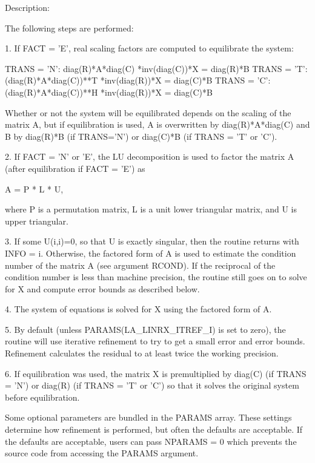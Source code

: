 \begin{DoxyParagraph}{Description\+: }
\begin{DoxyVerb}    The following steps are performed:

    1. If FACT = 'E', real scaling factors are computed to equilibrate
    the system:

      TRANS = 'N':  diag(R)*A*diag(C)     *inv(diag(C))*X = diag(R)*B
      TRANS = 'T': (diag(R)*A*diag(C))**T *inv(diag(R))*X = diag(C)*B
      TRANS = 'C': (diag(R)*A*diag(C))**H *inv(diag(R))*X = diag(C)*B

    Whether or not the system will be equilibrated depends on the
    scaling of the matrix A, but if equilibration is used, A is
    overwritten by diag(R)*A*diag(C) and B by diag(R)*B (if TRANS='N')
    or diag(C)*B (if TRANS = 'T' or 'C').

    2. If FACT = 'N' or 'E', the LU decomposition is used to factor
    the matrix A (after equilibration if FACT = 'E') as

      A = P * L * U,

    where P is a permutation matrix, L is a unit lower triangular
    matrix, and U is upper triangular.

    3. If some U(i,i)=0, so that U is exactly singular, then the
    routine returns with INFO = i. Otherwise, the factored form of A
    is used to estimate the condition number of the matrix A (see
    argument RCOND). If the reciprocal of the condition number is less
    than machine precision, the routine still goes on to solve for X
    and compute error bounds as described below.

    4. The system of equations is solved for X using the factored form
    of A.

    5. By default (unless PARAMS(LA_LINRX_ITREF_I) is set to zero),
    the routine will use iterative refinement to try to get a small
    error and error bounds.  Refinement calculates the residual to at
    least twice the working precision.

    6. If equilibration was used, the matrix X is premultiplied by
    diag(C) (if TRANS = 'N') or diag(R) (if TRANS = 'T' or 'C') so
    that it solves the original system before equilibration.\end{DoxyVerb}
 \begin{DoxyVerb}     Some optional parameters are bundled in the PARAMS array.  These
     settings determine how refinement is performed, but often the
     defaults are acceptable.  If the defaults are acceptable, users
     can pass NPARAMS = 0 which prevents the source code from accessing
     the PARAMS argument.\end{DoxyVerb}

\end{DoxyParagraph}

